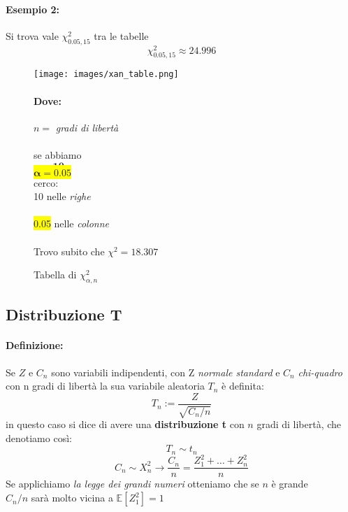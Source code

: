 \documentclass[]{article}
\newcommand{\ev}{\mathbb{E}[X]}
\renewcommand{\ev}[1]{\mathbb{E}[#1]}
\newcommand{\definizione}{\paragraph{Definizione:}}
\begin{document}
    \paragraph{Esempio 2:} Si trova vale $\chi_{0.05, 15}^2$ tra le tabelle
    \[ \chi_{0.05, 15}^2 \approx 24.996 \]

    \begin{figure}[H]
        \caption{Tabella di $\chi_{\alpha,n}^2$}
        \begin{minipage}{0.59\textwidth}
            \texttt{[image: images/xan\_table.png]}
        \end{minipage}
        \begin{minipage}{0.4\textwidth}
            \paragraph{Dove:}
            $n = $ \textit{gradi di libertà} \\ \\
            se abbiamo \\
            \colorbox{bittersweet}{$\boldsymbol{n = 10}$} \\
            \colorbox{yellow}{$\boldsymbol{\alpha = 0.05}$} \\
            cerco: \\
            \colorbox{bittersweet}{10} nelle \textit{righe} \\ \\
            \colorbox{yellow}{0.05} nelle \textit{colonne} \\ \\
            Trovo subito che $\chi^2 = 18.307$
        \end{minipage}
    \end{figure}

    \subsection{Distribuzione T}
    \definizione Se $Z$ e $C_n$ sono variabili indipendenti, con Z \textit{normale standard} e $C_n$ \textit{chi-quadro} con n gradi di libertà
    la sua variabile aleatoria $T_n$ è definita:
    \[ T_n := \frac{Z}{\sqrt{C_n / n}} \]
    in questo caso si dice di avere una \textbf{distribuzione t} con $n$ gradi di libertà, che denotiamo così:
    \[ T_n \sim t_n \]
    \[ C_n \sim X^2_n \longrightarrow \frac{C_n}{n} = \frac{Z_1^2 + \ldots + Z_n^2}{n} \]
    Se applichiamo \textit{la legge dei grandi numeri} otteniamo che se $n$ è grande \\
    $C_n / n$ sarà molto vicina a $\ev{Z_1^2} = 1$
\end{document}
